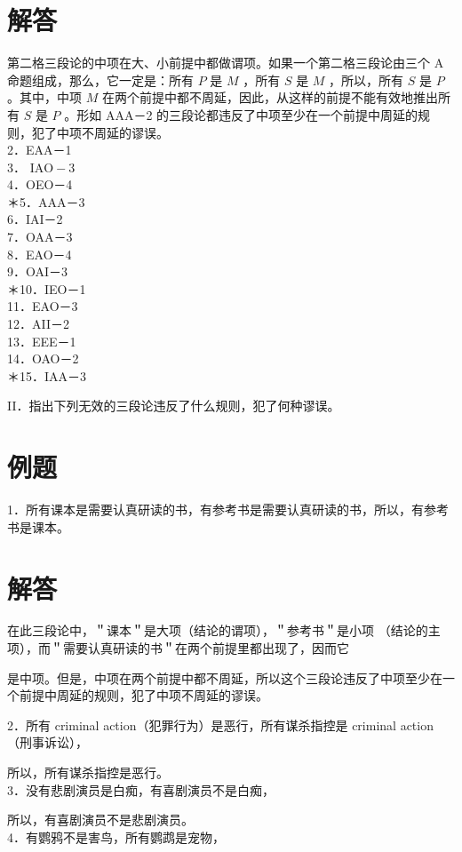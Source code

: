 \section*{解答}
第二格三段论的中项在大、小前提中都做谓项。如果一个第二格三段论由三个 A 命题组成，那么，它一定是：所有 $P$ 是 $M$ ，所有 $S$ 是 $M$ ，所以，所有 $S$ 是 $P$ 。其中，中项 $M$ 在两个前提中都不周延，因此，从这样的前提不能有效地推出所有 $S$ 是 $P$ 。形如 AAA－2 的三段论都违反了中项至少在一个前提中周延的规则，犯了中项不周延的谬误。\\
2．EAA－1\\
3． $\mathrm{IAO}-3$\\
4．OEO－4\\
＊5．AAA－3\\
6．IAI－2\\
7．OAA－3\\
8．EAO－4\\
9．OAI－3\\
＊10．IEO－1\\
11．EAO－3\\
12．AII－2\\
13．EEE－1\\
14．OAO－2\\
＊15．IAA－3

II．指出下列无效的三段论违反了什么规则，犯了何种谬误。

\section*{例题}
1．所有课本是需要认真研读的书，有参考书是需要认真研读的书，所以，有参考书是课本。

\section*{解答}
在此三段论中，＂课本＂是大项（结论的谓项），＂参考书＂是小项 （结论的主项），而＂需要认真研读的书＂在两个前提里都出现了，因而它

是中项。但是，中项在两个前提中都不周延，所以这个三段论违反了中项至少在一个前提中周延的规则，犯了中项不周延的谬误。

2．所有 criminal action（犯罪行为）是恶行，所有谋杀指控是 criminal action（刑事诉讼），

所以，所有谋杀指控是恶行。\\
3．没有悲剧演员是白痴，有喜剧演员不是白痴，

所以，有喜剧演员不是悲剧演员。\\
4．有鹦鸦不是害鸟，所有鹦鹉是宠物，

